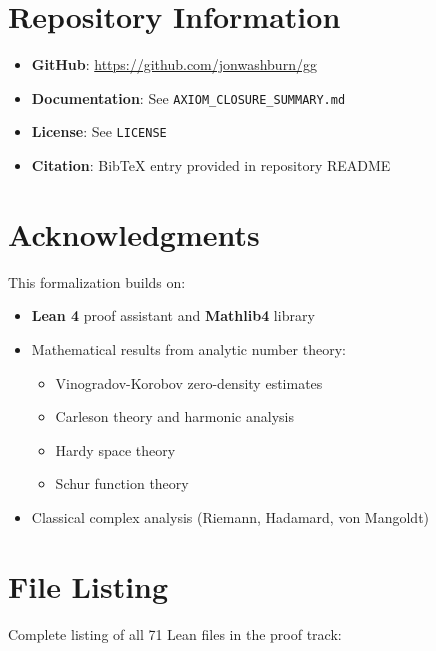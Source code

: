 \documentclass[12pt,a4paper]{article}
\begin{document}
\section{Repository Information}

\begin{itemize}
    \item \textbf{GitHub}: \url{https://github.com/jonwashburn/gg}
    \item \textbf{Documentation}: See \texttt{AXIOM\_CLOSURE\_SUMMARY.md}
    \item \textbf{License}: See \texttt{LICENSE}
    \item \textbf{Citation}: BibTeX entry provided in repository README
\end{itemize}

\section{Acknowledgments}

This formalization builds on:
\begin{itemize}
    \item \textbf{Lean 4} proof assistant and \textbf{Mathlib4} library
    \item Mathematical results from analytic number theory:
    \begin{itemize}
        \item Vinogradov-Korobov zero-density estimates
        \item Carleson theory and harmonic analysis
        \item Hardy space theory
        \item Schur function theory
    \end{itemize}
    \item Classical complex analysis (Riemann, Hadamard, von Mangoldt)
\end{itemize}

\appendix

\section{File Listing}

Complete listing of all 71 Lean files in the proof track:
\end{document}
